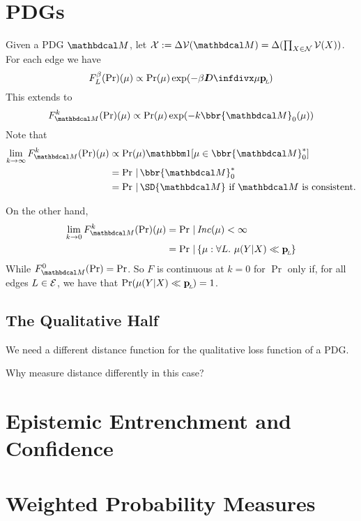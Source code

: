 \documentclass{article}
\begin{document}
\section{PDGs}

Given a PDG $\dg M$, let $\X := \Delta\V(\dg M) = \Delta(\prod_{X\in\N}\V(X))$. For each edge we have
\[ 
    F_L^{\beta}(\Pr) (\mu) \propto \Pr(\mu) \exp(-\beta \kldiv\mu \bp)
\] 
This extends to 
\[
    F_{\dg M}^k(\Pr)(\mu) \propto \Pr(\mu) \exp(- k \bbr{\dg M}_0(\mu))
\]
Note that 
\begin{align*}
    \lim_{k \to \infty} F_{\dg M}^k(\Pr)(\mu) &\propto 
        \Pr(\mu) \mathbbm1[\mu \in {\bbr{\dg M}^*_0}] \\
        &= \Pr \,|\, \bbr{\dg M}^*_0 \\
        &= \Pr \,|\, \SD{\dg M} \text{~if $\dg M$ is consistent.}
\end{align*}

On the other hand,
\begin{align*}
    \lim_{k \to 0} F_{\dg M}^k(\Pr)(\mu) &= \Pr \,|\, \Inc(\mu) < \infty \\
        &= \Pr \,|\, \{\mu : \forall L.~\mu(Y|X) \ll \bp \}
\end{align*}
While $F_{\dg M}^0(\Pr) = \Pr$. So $F$ is continuous at $k=0$ for $\Pr$ only if, for all edges $L \in \mathcal E$, we have that $\Pr(\mu(Y|X) \ll \mathbf{p}_{\!_{L}\!}) = 1$.




\subsection{The Qualitative Half}
We need a different distance function for the qualitative loss function of a PDG. 


Why measure distance differently in this case? 


\section{Epistemic Entrenchment and Confidence}
\section{Weighted Probability Measures}
\end{document}
